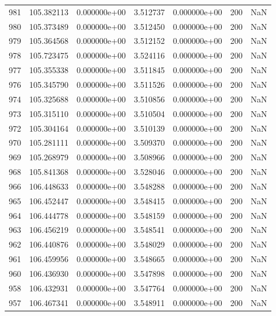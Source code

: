 \begin{tabular}{rrrrrrr}
 981 & 105.382113 &  0.000000e+00 &  3.512737 &  0.000000e+00 &         200 & NaN \\
 980 & 105.373489 &  0.000000e+00 &  3.512450 &  0.000000e+00 &         200 & NaN \\
 979 & 105.364568 &  0.000000e+00 &  3.512152 &  0.000000e+00 &         200 & NaN \\
 978 & 105.723475 &  0.000000e+00 &  3.524116 &  0.000000e+00 &         200 & NaN \\
 977 & 105.355338 &  0.000000e+00 &  3.511845 &  0.000000e+00 &         200 & NaN \\
 976 & 105.345790 &  0.000000e+00 &  3.511526 &  0.000000e+00 &         200 & NaN \\
 974 & 105.325688 &  0.000000e+00 &  3.510856 &  0.000000e+00 &         200 & NaN \\
 973 & 105.315110 &  0.000000e+00 &  3.510504 &  0.000000e+00 &         200 & NaN \\
 972 & 105.304164 &  0.000000e+00 &  3.510139 &  0.000000e+00 &         200 & NaN \\
 970 & 105.281111 &  0.000000e+00 &  3.509370 &  0.000000e+00 &         200 & NaN \\
 969 & 105.268979 &  0.000000e+00 &  3.508966 &  0.000000e+00 &         200 & NaN \\
 968 & 105.841368 &  0.000000e+00 &  3.528046 &  0.000000e+00 &         200 & NaN \\
 966 & 106.448633 &  0.000000e+00 &  3.548288 &  0.000000e+00 &         200 & NaN \\
 965 & 106.452447 &  0.000000e+00 &  3.548415 &  0.000000e+00 &         200 & NaN \\
 964 & 106.444778 &  0.000000e+00 &  3.548159 &  0.000000e+00 &         200 & NaN \\
 963 & 106.456219 &  0.000000e+00 &  3.548541 &  0.000000e+00 &         200 & NaN \\
 962 & 106.440876 &  0.000000e+00 &  3.548029 &  0.000000e+00 &         200 & NaN \\
 961 & 106.459956 &  0.000000e+00 &  3.548665 &  0.000000e+00 &         200 & NaN \\
 960 & 106.436930 &  0.000000e+00 &  3.547898 &  0.000000e+00 &         200 & NaN \\
 958 & 106.432931 &  0.000000e+00 &  3.547764 &  0.000000e+00 &         200 & NaN \\
 957 & 106.467341 &  0.000000e+00 &  3.548911 &  0.000000e+00 &         200 & NaN \\

\end{tabular}
